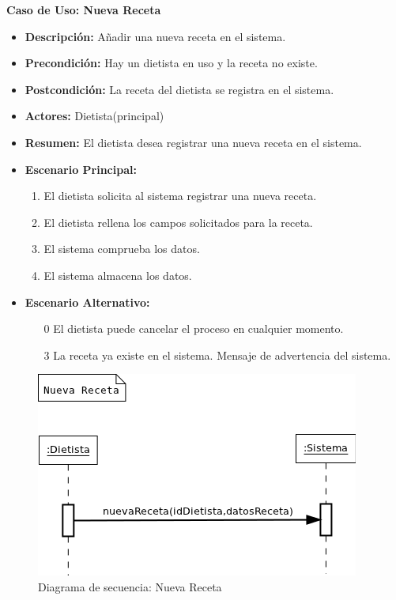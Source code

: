 \textbf{Caso de Uso: Nueva Receta}
\begin{itemize}
\item \textbf{Descripción:} Añadir una nueva receta en el sistema.
\item \textbf{Precondición:} Hay un dietista en uso y la receta no existe.
\item \textbf{Postcondición:} La receta del dietista se registra en el sistema.
\item \textbf{Actores:} Dietista(principal)
\item \textbf{Resumen:} El dietista desea registrar una nueva receta en el sistema.
\item \textbf{Escenario Principal:}
\begin{enumerate}
\item El dietista solicita al sistema registrar una nueva receta.
\item El dietista rellena los campos solicitados para la receta.
\item El sistema comprueba los datos.
\item El sistema almacena los datos.
\end{enumerate}
\item \textbf{Escenario Alternativo:}
\begin{enumerate}
\item[0] El dietista puede cancelar el proceso en cualquier momento.
\item[3] La receta ya existe en el sistema. Mensaje de advertencia del sistema.
\end{enumerate}
\end{itemize}
\begin{figure}[H]
  \label{ds_nuevareceta}
  \begin{center}
    \includegraphics[scale=0.7]{../img/DS_NuevaReceta.png}
  \end{center}
  \caption{Diagrama de secuencia: Nueva Receta}
\end{figure}
